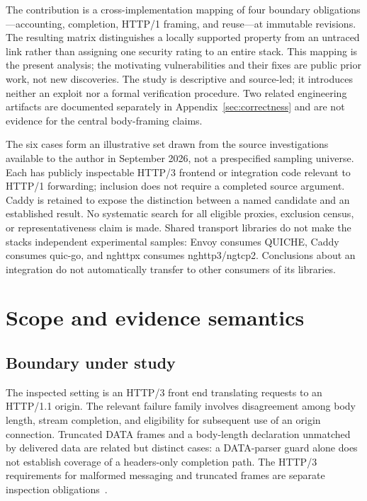 \documentclass[11pt,letterpaper]{article}
\begin{document}
The contribution is a cross-implementation mapping of four boundary obligations---accounting, completion, HTTP/1 framing, and reuse---at immutable revisions. The resulting matrix distinguishes a locally supported property from an untraced link rather than assigning one security rating to an entire stack. This mapping is the present analysis; the motivating vulnerabilities and their fixes are public prior work, not new discoveries. The study is descriptive and source-led; it introduces neither an exploit nor a formal verification procedure. Two related engineering artifacts are documented separately in Appendix~\ref{sec:correctness} and are not evidence for the central body-framing claims.

The six cases form an illustrative set drawn from the source investigations available to the author in September 2026, not a prespecified sampling universe. Each has publicly inspectable HTTP/3 frontend or integration code relevant to HTTP/1 forwarding; inclusion does not require a completed source argument. Caddy is retained to expose the distinction between a named candidate and an established result. No systematic search for all eligible proxies, exclusion census, or representativeness claim is made. Shared transport libraries do not make the stacks independent experimental samples: Envoy consumes QUICHE, Caddy consumes quic-go, and nghttpx consumes nghttp3/ngtcp2. Conclusions about an integration do not automatically transfer to other consumers of its libraries.

\section{Scope and evidence semantics}
\subsection{Boundary under study}
The inspected setting is an HTTP/3 front end translating requests to an HTTP/1.1 origin. The relevant failure family involves disagreement among body length, stream completion, and eligibility for subsequent use of an origin connection. Truncated DATA frames and a body-length declaration unmatched by delivered data are related but distinct cases: a DATA-parser guard alone does not establish coverage of a headers-only completion path. The HTTP/3 requirements for malformed messaging and truncated frames are separate inspection obligations~\cite{rfc9114}.
\end{document}
